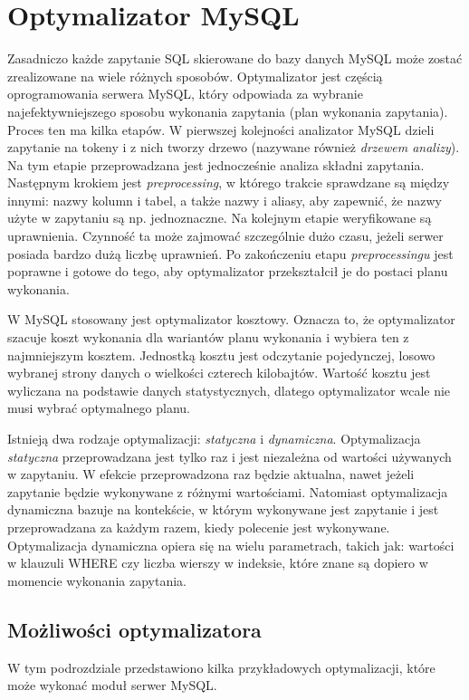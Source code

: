 \section{Optymalizator MySQL}

Zasadniczo każde zapytanie SQL skierowane do bazy danych MySQL może zostać zrealizowane na wiele różnych sposobów. Optymalizator jest częścią oprogramowania serwera MySQL, który odpowiada za wybranie najefektywniejszego sposobu wykonania zapytania (plan wykonania zapytania).
Proces ten ma kilka etapów. W pierwszej kolejności analizator MySQL dzieli zapytanie na tokeny i z nich tworzy drzewo (nazywane również \textit{drzewem analizy}). Na tym etapie przeprowadzana jest jednocześnie analiza składni zapytania. Następnym krokiem jest \textit{preprocessing}, w którego trakcie sprawdzane są między innymi: nazwy kolumn i tabel, a także nazwy i aliasy, aby zapewnić, że nazwy użyte w zapytaniu są np. jednoznaczne. Na kolejnym etapie weryfikowane są uprawnienia. Czynność ta może zajmować szczególnie dużo czasu, jeżeli serwer posiada bardzo dużą liczbę uprawnień. Po zakończeniu etapu \textit{preprocessingu}  jest poprawne i gotowe do tego, aby optymalizator przekształcił je do postaci planu wykonania.

W MySQL stosowany jest optymalizator kosztowy. Oznacza to, że optymalizator szacuje koszt wykonania dla wariantów planu wykonania i wybiera ten z najmniejszym kosztem. Jednostką kosztu jest odczytanie pojedynczej, losowo wybranej strony danych o wielkości czterech kilobajtów. Wartość kosztu jest wyliczana na podstawie danych statystycznych, dlatego optymalizator wcale nie musi wybrać optymalnego planu.

Istnieją dwa rodzaje optymalizacji: \textit{statyczna} i \textit{dynamiczna}. Optymalizacja \textit{statyczna} przeprowadzana jest tylko raz i jest niezależna od wartości używanych w zapytaniu. W efekcie przeprowadzona raz będzie aktualna, nawet jeżeli zapytanie będzie wykonywane z różnymi wartościami. Natomiast optymalizacja dynamiczna bazuje na kontekście, w którym wykonywane jest zapytanie i jest przeprowadzana za każdym razem, kiedy polecenie jest wykonywane. Optymalizacja dynamiczna opiera się na wielu parametrach, takich jak: wartości w klauzuli WHERE czy liczba wierszy w indeksie, które znane są dopiero w momencie wykonania zapytania.

\subsection{Możliwości optymalizatora}
W tym podrozdziale przedstawiono kilka przykładowych optymalizacji, które może wykonać moduł serwer MySQL.

